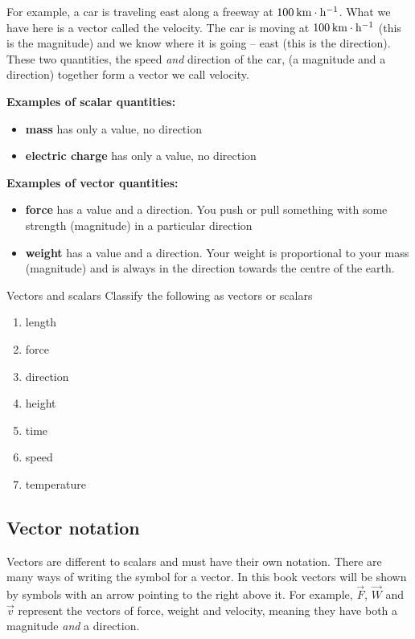 For example, a car is traveling east along a freeway at $100\phantom{\rule{2pt}{0ex}}\text{km}\ensuremath{\cdot}\text{h}{}^{-1}$. What we have here is a vector called the velocity. The car is moving at $100\phantom{\rule{2pt}{0ex}}\text{km}\ensuremath{\cdot}\text{h}{}^{-1}$ (this is the magnitude) and we know where it is going -- east (this is the direction). These two quantities, the speed \textit{and} direction of the car, (a magnitude and a direction) together form a vector we call velocity.

\textbf{Examples of scalar quantities:}
\begin{itemize}
\item \textbf{mass} has only a value, no direction
\item \textbf{electric charge} has only a value, no direction
\end{itemize}

\textbf{Examples of vector quantities:} 
\begin{itemize}
\item \textbf{force} has a value and a direction. You push or pull something with some strength (magnitude) in a particular direction 
\item \textbf{weight} has a value and a direction. Your weight is proportional to your mass (magnitude) and is always in the direction towards the centre of the earth.
\end{itemize}

\begin{exercises}{Vectors and scalars}
Classify the following as vectors or scalars
 \begin{enumerate}[noitemsep,label=\textbf{\arabic*}.]
\item length
\item force
\item direction
\item height
\item time
\item speed
\item temperature
 \end{enumerate}
\end{exercises}

    \label{m38812*cid4}
      \label{m38812*uid1}
\subsection*{Vector notation}
            \nopagebreak
Vectors are different to scalars and must have their own notation. There are many ways of writing the symbol for a vector. In this book vectors will be shown by symbols with an arrow pointing to the right above it. For example, $\stackrel{\to }{F}$, $\stackrel{\to }{W}$ and $\stackrel{\to }{v}$ represent the vectors of force, weight and velocity, meaning they have both a magnitude \textit{and} a direction.

